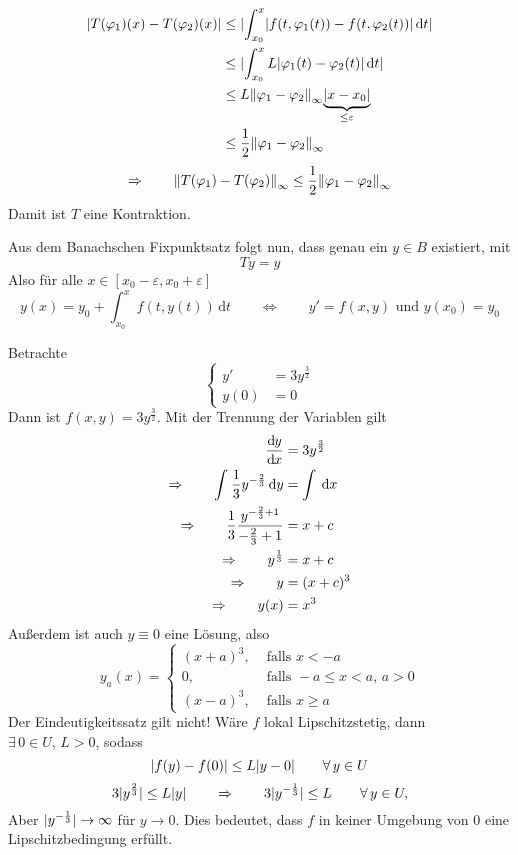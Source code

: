 \begin{beweis}
\begin{enumerate}[(i)]
		\begin{align*}
			\abs{T(\varphi_1)(x)-T(\varphi_2)(x)} &\leq \abs{\int_{x_0}^{x} \abs{f(t,\varphi_1(t))- f(t,\varphi_2(t))} \,\mathrm{d}t} \\
			&\leq \abs{\int_{x_0}^{x} L \abs{ \varphi_1(t)-\varphi_2(t)} \,\mathrm{d}t} \\
			&\leq  L \norm{\varphi_1- \varphi_2}_{\infty} \underset{\leq \varepsilon}{\underbrace{\abs{x-x_0}}} \\
			&\leq \frac{1}{2} \norm{\varphi_1- \varphi_2}_{\infty}
		\end{align*}
		\[
			\Rightarrow \qquad \norm{T(\varphi_1)-T(\varphi_2)}_{\infty} \leq \frac{1}{2}\norm{ \varphi_1- \varphi_2}_{\infty}
		\]
		Damit ist $T$ eine Kontraktion.
	\end{enumerate}
	Aus dem Banachschen Fixpunktsatz folgt nun, dass genau ein $ y \in B$ existiert, mit
	\[
		Ty=y 
	\] 
	Also für alle $x \in [x_0 - \varepsilon , x_0 + \varepsilon]$
	\[
		y(x) = y_0 + \int_{x_0}^{x} f(t,y(t)) \,\mathrm{d}t \qquad \Leftrightarrow \qquad y'=f(x,y) \text{ und } y(x_0) = y_0
	\]
\end{beweis}
\begin{beispiel}
	Betrachte
	\[
		\begin{cases}
			y'&=3y^{\frac{3}{2}} \\ 
			y(0)&= 0
		\end{cases}
	\]
	Dann ist $f(x,y) = 3 y^{\frac{3}{2}}$. Mit der Trennung der Variablen gilt
	\begin{align*}
		\frac{\mathrm{d}\mkern-1.0mu y}{\mathrm{d}\mkern-1.0mu x}  &= 3 y^{\frac{3}{2}} \\
		\Rightarrow \qquad \int_{}^{} \frac{1}{3} y^{- \frac{2}{3}} \,\mathrm{d}y &= \int_{}^{} \,\mathrm{d}x \\
		\Rightarrow \qquad \frac{1}{3} \frac{y^{- \frac{2}{3}+1}}{- \frac{2}{3}+1} &= x + c \\
		\Rightarrow \qquad y^{\frac{1}{3}} &= x+ c \\
		\Rightarrow \qquad y &= (x+c)^3 \\
		\Rightarrow \qquad y(x) &= x^3
	\end{align*}
	Außerdem ist auch $y \equiv 0$ eine Lösung, also
	\[
		y_a(x) = \begin{cases}
			(x+a)^3, &\text{ falls }x<-a\\
			0, &\text{ falls }-a \leq x < a, \,a >0 \\
			(x-a)^3, &\text{ falls }x \geq a
		\end{cases}
	\]
	Der Eindeutigkeitssatz gilt nicht! Wäre $f$ lokal Lipschitzstetig, dann $\exists\, 0 \in U,\, L>0$, sodass
	\[
		\lvert f(y)-f(0)\rvert \leq L \lvert y-0\rvert \qquad \forall\, y \in U
	\]
	\[
		3 \lvert y^{\frac{2}{3}}\rvert \leq L \lvert y\rvert \qquad \Rightarrow \qquad 3 \lvert y^{-\frac{1}{3}}\rvert \leq  L \qquad \forall\, y \in U,
	\]
	Aber $\lvert y^{- \frac{1}{3}}\rvert \to  \infty$ für $y \to 0$. Dies bedeutet, dass $f$ in keiner Umgebung von $0$ eine Lipschitzbedingung erfüllt.
\end{beispiel}

